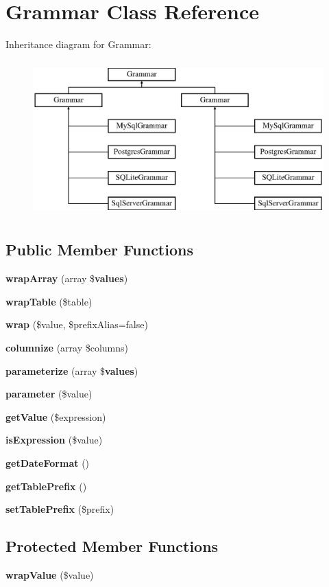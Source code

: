 \section{Grammar Class Reference}
\label{class_illuminate_1_1_database_1_1_grammar}
Inheritance diagram for Grammar\+:\begin{figure}[H]
\begin{center}
\leavevmode
\includegraphics[height=6.000000cm]{class_illuminate_1_1_database_1_1_grammar}
\end{center}
\end{figure}
\subsection*{Public Member Functions}
\begin{DoxyCompactItemize}
\item 
{\bf wrap\+Array} (array \${\bf values})
\item 
{\bf wrap\+Table} (\$table)
\item 
{\bf wrap} (\$value, \$prefix\+Alias=false)
\item 
{\bf columnize} (array \$columns)
\item 
{\bf parameterize} (array \${\bf values})
\item 
{\bf parameter} (\$value)
\item 
{\bf get\+Value} (\$expression)
\item 
{\bf is\+Expression} (\$value)
\item 
{\bf get\+Date\+Format} ()
\item 
{\bf get\+Table\+Prefix} ()
\item 
{\bf set\+Table\+Prefix} (\$prefix)
\end{DoxyCompactItemize}
\subsection*{Protected Member Functions}
\begin{DoxyCompactItemize}
\item 
{\bf wrap\+Value} (\$value)
\end{DoxyCompactItemize}
